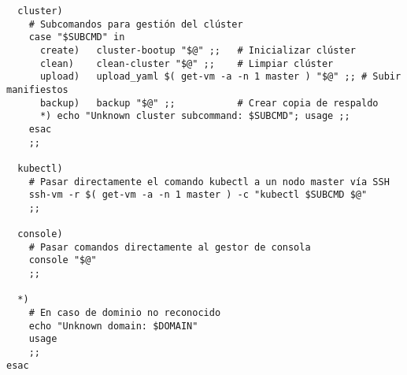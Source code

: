 \begin{verbatim}
  cluster)
    # Subcomandos para gestión del clúster
    case "$SUBCMD" in
      create)   cluster-bootup "$@" ;;   # Inicializar clúster
      clean)    clean-cluster "$@" ;;    # Limpiar clúster
      upload)   upload_yaml $( get-vm -a -n 1 master ) "$@" ;; # Subir manifiestos
      backup)   backup "$@" ;;           # Crear copia de respaldo
      *) echo "Unknown cluster subcommand: $SUBCMD"; usage ;;
    esac
    ;;

  kubectl)
    # Pasar directamente el comando kubectl a un nodo master vía SSH
    ssh-vm -r $( get-vm -a -n 1 master ) -c "kubectl $SUBCMD $@"
    ;;

  console)
    # Pasar comandos directamente al gestor de consola
    console "$@"
    ;;

  *)
    # En caso de dominio no reconocido
    echo "Unknown domain: $DOMAIN"
    usage
    ;;
esac
\end{verbatim}
